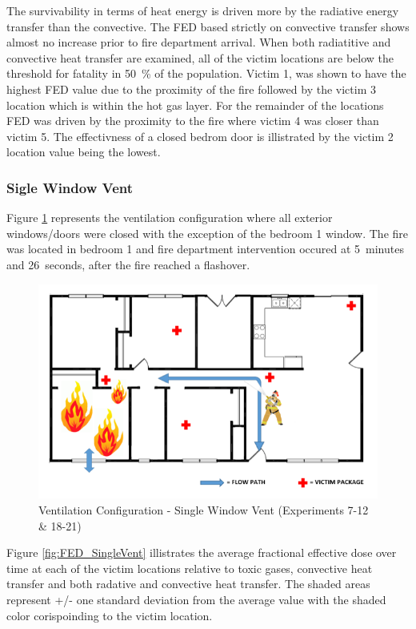 \documentclass[12pt,oneside]{book}
\begin{document}
The survivability in terms of heat energy is driven more by the radiative energy transfer than the convective. The FED based strictly on convective transfer shows almost no increase prior to fire department arrival. When both radiatitive and convective heat transfer are examined, all of the victim locations are below the threshold for fatality in 50~\% of the population. Victim 1, was shown to have the highest FED value due to the proximity of the fire followed by the victim 3 location which is within the hot gas layer. For the remainder of the locations FED was driven by the proximity to the fire where victim 4 was closer than victim 5. The effectivness of a closed bedrom door is illistrated by the victim 2 location value being the lowest. 

\subsubsection{Sigle Window Vent}

Figure \ref{fig:Vent_Profile-Single_Vent} represents the ventilation configuration where all exterior windows/doors were closed with the exception of the bedroom 1 window. The fire was located in bedroom 1 and fire department intervention occured  at 5~minutes and 26~seconds, after the fire reached a flashover. 

\begin{figure}[H]
	\centering
	\includegraphics[width=.65\textwidth]{../0_Images/Ventilation_Configurations/Single_Vent.png}
	\caption{Ventilation Configuration - Single Window Vent (Experiments 7-12 \& 18-21)}
	\label{fig:Vent_Profile-Single_Vent}
\end{figure}

Figure \ref{fig:FED_SingleVent} illistrates the average fractional effective dose over time at each of the victim locations relative to toxic gases, convective heat transfer and both radative and convective heat transfer. The shaded areas represent +/- one standard deviation from the average value with the shaded color corispoinding to the victim location. 
\end{document}
